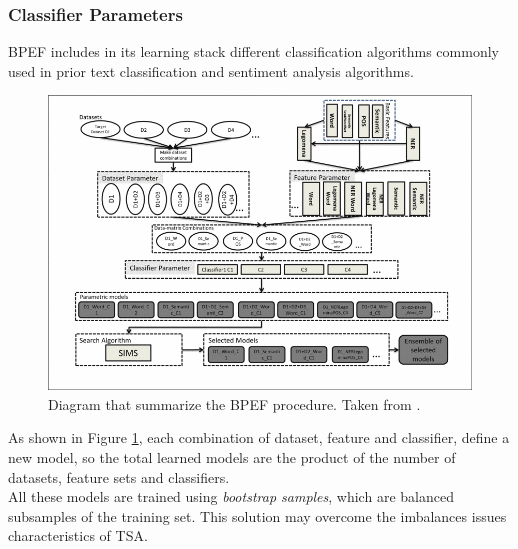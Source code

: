 \subsubsection{Classifier Parameters}

\ac{BPEF} includes in its learning stack different classification algorithms commonly used in prior text classification and sentiment analysis algorithms. \\

\begin{figure}[ht]
	\centering
	\includegraphics[width=1\textwidth]{figures/bpef.png}
	\caption{Diagram that summarize the \ac{BPEF} procedure. Taken from \cite{Hassan2013TwitterSA}.}
	\label{fig:bpef}
\end{figure}

 As shown in Figure \ref{fig:bpef}, each combination of dataset, feature and classifier, define a new model, so the total learned models are the product of the number of datasets, feature sets and classifiers.\\
 All these models are trained using \textit{bootstrap samples}, which are balanced subsamples of the training set. This solution may overcome the imbalances issues characteristics of \ac{TSA}.
 
 
